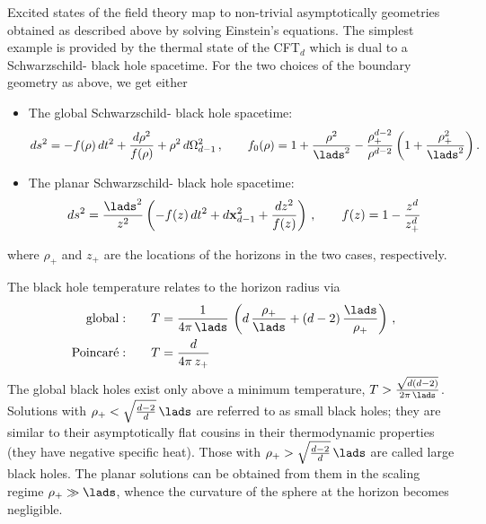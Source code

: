 \documentclass[12pt,openany]{book}
\begin{document}
Excited states of the field theory map to non-trivial asymptotically  geometries obtained as described above by solving Einstein's equations. The simplest example is provided by the thermal state of the CFT$_d$ which is dual to a Schwarzschild- black hole spacetime. For the two choices of the boundary geometry as above, we get either
\begin{itemize}
\item The global Schwarzschild- black hole spacetime:
%
\begin{equation}
ds^2 = -f(\rho)\, dt^2 + \frac{d\rho^2}{f(\rho)} + \rho^2 \, d\Omega_{d-1}^2 \,, \qquad f_0(\rho) =1+\frac{\rho^2}{\lads^2}  - \frac{\rho_+^{d-2}}{\rho^{d-2}} \left(1+ \frac{\rho_+^2}{\lads^2}\right).
\label{eq:gsads}
\end{equation}
%
\item The planar Schwarzschild- black hole spacetime:
%
\begin{equation}
ds^2 = \frac{\lads^2}{z^2} \left(- f(z) \, dt^2 + d{\bf x}_{d-1}^2 + \frac{dz^2}{f(z)} \right) \,, \qquad f(z) = 1- \frac{z^d}{z_+^d}
\label{eq:psads}
\end{equation}
%
\end{itemize}
where $\rho_+$ and $z_+$ are the locations of the horizons in the two cases, respectively.

 The  black hole temperature relates to the horizon radius via
%
\begin{equation}
\begin{split}
\text{global}: & \qquad T= \frac{1}{4\pi\,\lads} \, \left( d\,\frac{\rho_+}{\lads} + (d-2)\, \frac{\lads}{\rho_+}\right) \,, \\
\text{Poincar\'e}: & \qquad T = \frac{d }{4\pi\, z_+}
\end{split}
\label{eq:Tsads}
\end{equation}
%
The global black holes exist only above a minimum temperature, $T > \frac{\sqrt{d(d-2)}}{2\pi\, \lads} $.  Solutions with $\rho_+ < \sqrt{\frac{d-2}{d}}\, \lads$ are referred to as  small black holes; they are similar to their asymptotically flat cousins in their thermodynamic properties (they have negative specific heat). Those with $\rho_+ >\sqrt{\frac{d-2}{d}}\,\lads$ are called  large black holes. The planar solutions can be obtained from them in the scaling regime $\rho_+ \gg \lads$, whence the curvature of the sphere at the horizon becomes negligible.
\end{document}
